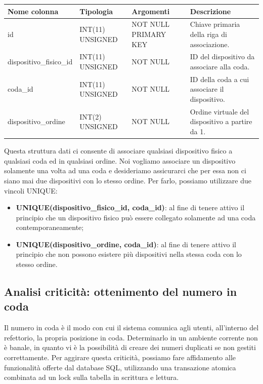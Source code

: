 \documentclass[a4paper, titlepage, 12pt, openright, oneside]{book}
\begin{document}
\begin{center}
    \begin{tabular}{ | l | l | p{3cm} | p{3cm} |}
    \hline
    Nome colonna & Tipologia & Argomenti & Descrizione \\ \hline
    id & INT(11) UNSIGNED & NOT NULL PRIMARY KEY & Chiave primaria della riga di associazione. \\ \hline
    dispositivo\_fisico\_id & INT(11) UNSIGNED & NOT NULL & ID del dispositivo da associare alla coda. \\ \hline
    coda\_id & INT(11) UNSIGNED & NOT NULL & ID della coda a cui associare il dispositivo. \\ \hline
    dispositivo\_ordine & INT(2) UNSIGNED & NOT NULL & Ordine virtuale del dispositivo a partire da 1. \\ \hline
    \end{tabular}
\end{center}

Questa struttura dati ci consente di associare qualsiasi dispositivo fisico a qualsiasi coda ed in qualsiasi ordine. Noi vogliamo associare un dispositivo solamente una volta ad una coda e desideriamo assicurarci che per essa non ci siano mai due dispositivi con lo stesso ordine. Per farlo, possiamo utilizzare due vincoli UNIQUE:
\begin{itemize}
	\item \textbf{UNIQUE(dispositivo\_fisico\_id, coda\_id)}: al fine di tenere attivo il principio che un dispositivo fisico può essere collegato solamente ad una coda contemporaneamente;
	\item \textbf{UNIQUE(dispositivo\_ordine, coda\_id)}: al fine di tenere attivo il principio che non possono esistere più dispositivi nella stessa coda con lo stesso ordine.
\end{itemize}

\subsection{Analisi criticità: ottenimento del numero in coda}

Il numero in coda è il modo con cui il sistema comunica agli utenti, all'interno del refettorio, la propria posizione in coda. Determinarlo in un ambiente corrente non è banale, in quanto vi è la possibilità di creare dei numeri duplicati se non gestiti correttamente. Per aggirare questa criticità, possiamo fare affidamento alle funzionalità offerte dal database SQL, utilizzando una transazione atomica combinata ad un lock sulla tabella in scrittura e lettura.
\end{document}
